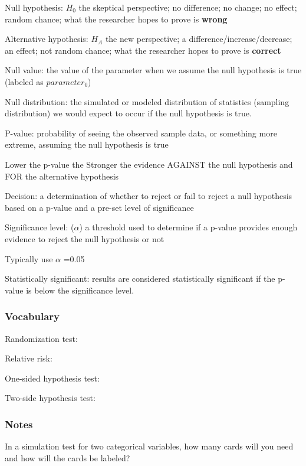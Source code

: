 \documentclass[
]{report}
\newcommand{\rgs}{\vspace{12pt}} %
\newcommand{\rgi}{\hspace{24pt}}  %
\begin{document}
Null hypothesis: \(H_0\) the skeptical perspective; no difference; no change; no effect; random chance; what the researcher hopes to prove is \textbf{wrong}

Alternative hypothesis: \(H_A\) the new perspective; a difference/increase/decrease; an effect; not random chance; what the researcher hopes to prove is \textbf{correct}

Null value: the value of the parameter when we assume the null hypothesis is true (labeled as \(parameter_0\))

Null distribution: the simulated or modeled distribution of statistics (sampling distribution) we would expect to occur if the null hypothesis is true.

P-value: probability of seeing the observed sample data, or something more extreme, assuming the null hypothesis is true

\rgi Lower the p-value the Stronger the evidence AGAINST the null hypothesis and FOR the alternative hypothesis

Decision: a determination of whether to reject or fail to reject a null hypothesis based on a p-value and a pre-set level of significance

Significance level: (\(\alpha\)) a threshold used to determine if a p-value provides enough evidence to reject the null hypothesis or not

\rgi Typically use \(\alpha\) =0.05

Statistically significant: results are considered statistically significant if the p-value is below the significance level.

\hypertarget{vocabulary-15}{%
\subsubsection*{Vocabulary}\label{vocabulary-15}}

Randomization test:
\rgs

Relative risk:
\rgs

One-sided hypothesis test:
\rgs

Two-side hypothesis test:
\rgs

\hypertarget{notes-19}{%
\subsubsection*{Notes}\label{notes-19}}

In a simulation test for two categorical variables, how many cards will you need and how will the cards be labeled?
\rgs
\end{document}
